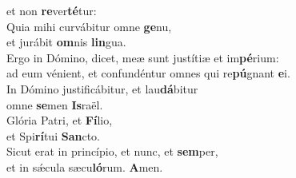 \oddverse et non \textbf{re}ver\textbf{té}tur:\\
\evenverse Quia mihi curvábitur omne \textbf{ge}nu,~\*\\
\evenverse et jurábit \textbf{om}nis \textbf{lin}gua.\\
\oddverse Ergo in Dómino, dicet, meæ sunt justítiæ et im\textbf{pé}rium:~\*\\
\oddverse ad eum vénient, et confundéntur omnes qui re\textbf{pú}gnant \textbf{e}i.\\
\evenverse In Dómino justificábitur, et lau\textbf{dá}bitur~\*\\
\evenverse omne \textbf{se}men \textbf{Is}raël.\\
\oddverse Glória Patri, et \textbf{Fí}lio,~\*\\
\oddverse et Spi\textbf{rí}tui \textbf{San}cto.\\
\evenverse Sicut erat in princípio, et nunc, et \textbf{sem}per,~\*\\
\evenverse et in sǽcula sæcu\textbf{ló}rum. \textbf{A}men.\\
